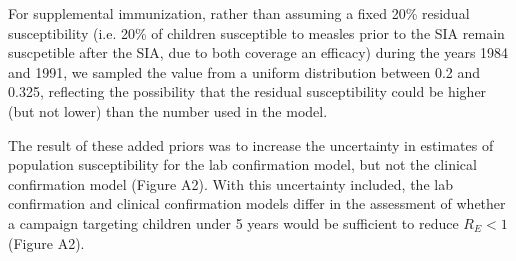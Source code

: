 For supplemental immunization, rather than assuming a fixed 20\% residual susceptibility (i.e. 20\% of children susceptible to measles prior to the SIA remain suscpetible after the SIA, due to both coverage an efficacy) during the years 1984 and 1991, we sampled the value from a uniform distribution between 0.2 and 0.325, reflecting the possibility that the residual susceptibility could be higher (but not lower) than the number used in the model.

The result of these added priors was to increase the uncertainty in estimates of population susceptibility for the lab confirmation model, but not the clinical confirmation model (Figure A2). With this uncertainty included, the lab confirmation and clinical confirmation models differ in the assessment of whether a campaign targeting children under 5 years would be sufficient to reduce $R_E < 1$ (Figure A2). 